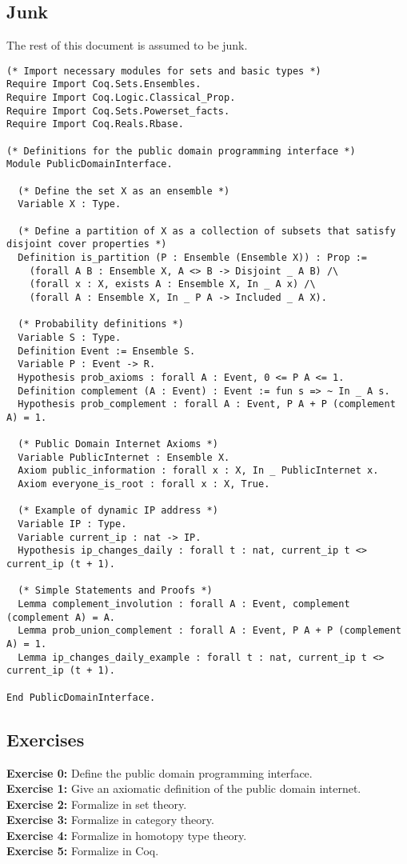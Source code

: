 \documentclass{article}
\begin{document}
\subsection*{Junk}
The rest of this document is assumed to be junk.
\begin{lstlisting}[language=Coq]
(* Import necessary modules for sets and basic types *)
Require Import Coq.Sets.Ensembles.
Require Import Coq.Logic.Classical_Prop.
Require Import Coq.Sets.Powerset_facts.
Require Import Coq.Reals.Rbase.

(* Definitions for the public domain programming interface *)
Module PublicDomainInterface.

  (* Define the set X as an ensemble *)
  Variable X : Type.

  (* Define a partition of X as a collection of subsets that satisfy disjoint cover properties *)
  Definition is_partition (P : Ensemble (Ensemble X)) : Prop :=
    (forall A B : Ensemble X, A <> B -> Disjoint _ A B) /\
    (forall x : X, exists A : Ensemble X, In _ A x) /\
    (forall A : Ensemble X, In _ P A -> Included _ A X).

  (* Probability definitions *)
  Variable S : Type.
  Definition Event := Ensemble S.
  Variable P : Event -> R.
  Hypothesis prob_axioms : forall A : Event, 0 <= P A <= 1.
  Definition complement (A : Event) : Event := fun s => ~ In _ A s.
  Hypothesis prob_complement : forall A : Event, P A + P (complement A) = 1.

  (* Public Domain Internet Axioms *)
  Variable PublicInternet : Ensemble X.
  Axiom public_information : forall x : X, In _ PublicInternet x.
  Axiom everyone_is_root : forall x : X, True.

  (* Example of dynamic IP address *)
  Variable IP : Type.
  Variable current_ip : nat -> IP.
  Hypothesis ip_changes_daily : forall t : nat, current_ip t <> current_ip (t + 1).

  (* Simple Statements and Proofs *)
  Lemma complement_involution : forall A : Event, complement (complement A) = A.
  Lemma prob_union_complement : forall A : Event, P A + P (complement A) = 1.
  Lemma ip_changes_daily_example : forall t : nat, current_ip t <> current_ip (t + 1).

End PublicDomainInterface.
\end{lstlisting}

\subsection*{Exercises}
\textbf{Exercise 0:} Define the public domain programming interface. \\
\textbf{Exercise 1:} Give an axiomatic definition of the public domain internet. \\
\textbf{Exercise 2:} Formalize in set theory. \\
\textbf{Exercise 3:} Formalize in category theory. \\
\textbf{Exercise 4:} Formalize in homotopy type theory. \\
\textbf{Exercise 5:} Formalize in Coq.
\end{document}
